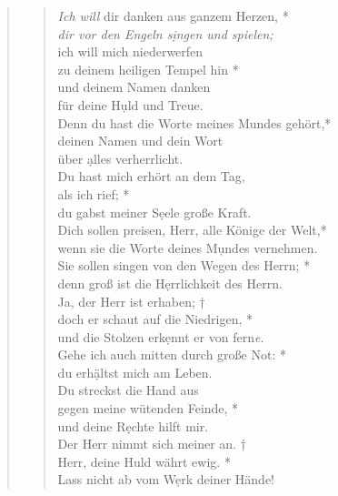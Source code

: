 
\vspace{0.3cm}


\begin{quote}
\begin{verse}
\textit{Ich will} dir danken aus ganzem Herzen, *\\ 
\textit{dir vor den Engeln s\d ingen und spielen;} \\ 
\vin ich will mich niederwerfen\\ 
\vin zu deinem heiligen Tempel hin *\\ 
\vin und deinem Namen danken\\ 
\vin für deine H\d uld und Treue.\\ 
Denn du hast die Worte meines Mundes gehört,*\\  
deinen Namen und dein Wort\\
über \d alles verherrlicht.\\ 
\vin Du hast mich erhört an dem Tag,\\ 
\vin als ich rief; *\\ 
\vin du gabst meiner S\d eele große Kraft.\\ 
Dich sollen preisen, Herr, alle Könige der Welt,*\\ 
wenn sie die Worte deines M\d undes vernehmen.\\ 
\vin Sie sollen singen von den Wegen des Herrn; *\\ 
\vin denn groß ist die H\d errlichkeit des Herrn.\\ 
Ja, der Herr ist erhaben; †\\
doch er schaut auf die Niedrigen, *\\  
und die Stolzen erk\d ennt er von fern\textit{e}.\\ 
\vin Gehe ich auch mitten durch große Not: *\\ 
\vin du erh\d ältst mich am Leben.\\  
Du streckst die Hand aus\\
gegen meine wütenden Feinde, *\\  
und deine R\d echte hilft mir.\\ 
\vin Der Herr nimmt sich meiner an. †\\ 
\vin Herr, deine Huld währt ewig. *\\ 
\vin Lass nicht ab vom W\d erk deiner Hände!\\

\end{verse}
\end{quote}


